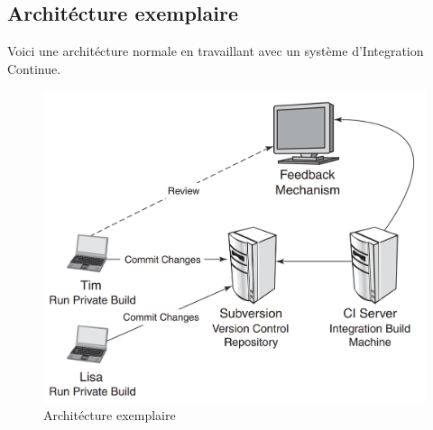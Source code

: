 \subsection{Architécture exemplaire}
Voici une architécture normale en travaillant avec un système d'Integration Continue.
\begin{figure}[H]
	\centering
		\includegraphics[scale=0.6]{bilder/architecture_exemplaire}
	\caption{Architécture exemplaire}
	\label{fig:processus}
\end{figure}


